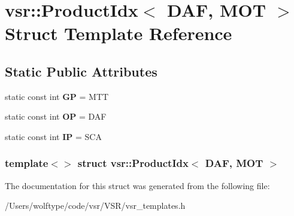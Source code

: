 \hypertarget{structvsr_1_1_product_idx_3_01_d_a_f_00_01_m_o_t_01_4}{\section{vsr\-:\-:Product\-Idx$<$ D\-A\-F, M\-O\-T $>$ Struct Template Reference}
\label{structvsr_1_1_product_idx_3_01_d_a_f_00_01_m_o_t_01_4}
}
\subsection*{Static Public Attributes}
\begin{DoxyCompactItemize}
\item 
\hypertarget{structvsr_1_1_product_idx_3_01_d_a_f_00_01_m_o_t_01_4_abff8fac5c582b02cd49991927ae3259b}{static const int {\bfseries G\-P} = M\-T\-T}\label{structvsr_1_1_product_idx_3_01_d_a_f_00_01_m_o_t_01_4_abff8fac5c582b02cd49991927ae3259b}

\item 
\hypertarget{structvsr_1_1_product_idx_3_01_d_a_f_00_01_m_o_t_01_4_a2afb931476ba028869345ba865b5b003}{static const int {\bfseries O\-P} = D\-A\-F}\label{structvsr_1_1_product_idx_3_01_d_a_f_00_01_m_o_t_01_4_a2afb931476ba028869345ba865b5b003}

\item 
\hypertarget{structvsr_1_1_product_idx_3_01_d_a_f_00_01_m_o_t_01_4_a7395f75a10603158b0f9b642b99c6627}{static const int {\bfseries I\-P} = S\-C\-A}\label{structvsr_1_1_product_idx_3_01_d_a_f_00_01_m_o_t_01_4_a7395f75a10603158b0f9b642b99c6627}

\end{DoxyCompactItemize}
\subsubsection*{template$<$$>$ struct vsr\-::\-Product\-Idx$<$ D\-A\-F, M\-O\-T $>$}



The documentation for this struct was generated from the following file\-:\begin{DoxyCompactItemize}
\item 
/\-Users/wolftype/code/vsr/\-V\-S\-R/vsr\-\_\-templates.\-h\end{DoxyCompactItemize}
